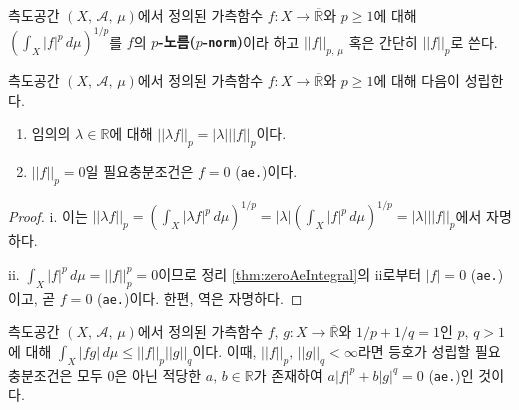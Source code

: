 \begin{definition}
    측도공간 $(X,\,\mathcal{A},\,\mu)$에서 정의된 가측함수 $f:X\to\overline{\mathbb{R}}$와 $p\geq1$에 대해 $(\int_X|f|^p\,d\mu)^{1/p}$를 $f$의 \textbf{$p$-노름($p$-\texttt{norm})}이라 하고 $||f||_{p,\,\mu}$ 혹은 간단히 $||f||_p$로 쓴다.
\end{definition}

\begin{proposition}\label{prop:lpnormScale}
    측도공간 $(X,\,\mathcal{A},\,\mu)$에서 정의된 가측함수 $f:X\to\overline{\mathbb{R}}$와 $p\geq1$에 대해 다음이 성립한다.
    \begin{enumerate}
        \item 임의의 $\lambda\in\mathbb{R}$에 대해 $||\lambda f||_p=|\lambda|||f||_p$이다.
        \item $||f||_p=0$일 필요충분조건은 $f=0$ (\texttt{ae.})이다.
    \end{enumerate}
\end{proposition}

\begin{proof}
    i. 이는 $||\lambda f||_p=(\int_X|\lambda f|^p\,d\mu)^{1/p}=|\lambda|(\int_X|f|^p\,d\mu)^{1/p}=|\lambda|||f||_p$에서 자명하다.

    ii. $\int_X|f|^p\,d\mu=||f||_p^p=0$이므로 정리 \ref{thm:zeroAeIntegral}의 ii로부터  $|f|=0$ (\texttt{ae.})이고, 곧 $f=0$ (\texttt{ae.})이다. 한편, 역은 자명하다.
\end{proof}

\begin{theorem}\label{thm:holderIneq}
    측도공간 $(X,\,\mathcal{A},\,\mu)$에서 정의된 가측함수 $f,\,g:X\to\overline{\mathbb{R}}$와 $1/p+1/q=1$인 $p,\,q>1$에 대해 $\int_X|fg|\,d\mu\leq||f||_p||g||_q$이다. 이때, $||f||_p,\,||g||_q<\infty$라면 등호가 성립할 필요충분조건은 모두 $0$은 아닌 적당한 $a,\,b\in\mathbb{R}$가 존재하여 $a|f|^p+b|g|^q=0$ (\texttt{ae.})인 것이다.
\end{theorem}

